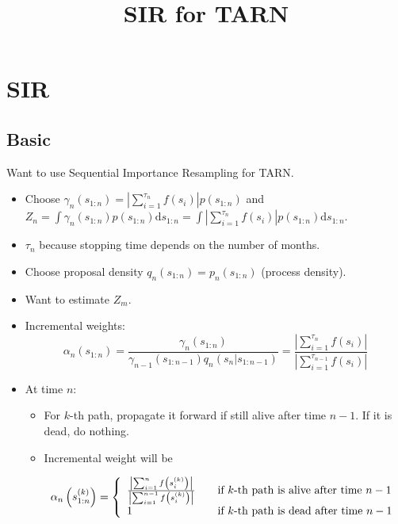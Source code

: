\documentclass{article}
\begin{document}
\title{SIR for TARN}
\maketitle

\section{SIR}

\subsection{Basic}

Want to use Sequential Importance Resampling for TARN. 

\begin{itemize}

\item Choose $ \gamma_{n}(s_{1:n}) = | \sum_{i=1}^{\tau_{n}} f(s_{i}) |p(s_{1:n}) $ and $Z_{n} = \int \gamma_{n}(s_{1:n}) p(s_{1:n}) \text{d} s_{1:n} = \int | \sum_{i=1}^{\tau_{n}} f(s_{i}) | p(s_{1:n}) \text{d} s_{1:n} $.

\item $\tau_{n}$ because stopping time depends on the number of months. 

\item Choose proposal density $q_{n}(s_{1:n}) = p_{n}(s_{1:n})$ (process density).

\item Want to estimate $Z_{m}$.

\item Incremental weights: 
$$ \alpha_{n}(s_{1:n}) = \frac{ \gamma_{n}(s_{1:n}) }{ \gamma_{n-1}(s_{1:n-1}) q_{n}(s_{n}|s_{1:n-1}) } = \frac{ \left | \sum_{i=1}^{\tau_{n}} f(s_{i}) \right | }{ \left | \sum_{i=1}^{\tau_{n-1}} f(s_{i}) \right | } $$ 

\item At time $n$: 
\begin{itemize} 
\item For $k$-th path, propagate it forward if still alive after time $n-1$. If it is dead, do nothing. 

\item Incremental weight will be

\[ \alpha_{n} \left ( s_{1:n}^{(k)} \right ) = \left\{ 
  \begin{array}{l l}
    \frac{ \left | \sum_{i=1}^{n} f \left ( s_{i}^{(k)} \right ) \right | }{ \left | \sum_{i=1}^{n-1} f \left ( s_{i}^{(k)} \right ) \right | } & \quad \text{if $k$-th path is alive after time $n-1$}\\
   1 & \quad \text{if $k$-th path is dead after time $n-1$}
  \end{array} \right.\]


\end{itemize}
\end{itemize}
\end{document}
